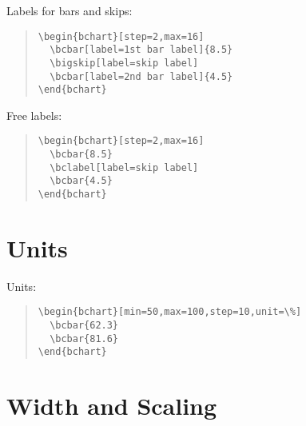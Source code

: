 \documentclass{article}
\begin{document}
Labels for bars and skips:
\begin{quote}\small
\begin{verbatim}
\begin{bchart}[step=2,max=16]
  \bcbar[label=1st bar label]{8.5}
  \bigskip[label=skip label]
  \bcbar[label=2nd bar label]{4.5}
\end{bchart}
\end{verbatim}
\end{quote}
\begin{quote}
\begin{bchart}[step=2,max=16]
  \bigskip[label=skip label]
\end{bchart}
\end{quote}

Free labels:
\begin{quote}\small
\begin{verbatim}
\begin{bchart}[step=2,max=16]
  \bcbar{8.5}
  \bclabel[label=skip label]
  \bcbar{4.5}
\end{bchart}
\end{verbatim}
\end{quote}
\begin{quote}
\begin{bchart}[step=2,max=16]
\end{bchart}
\end{quote}


\section{Units}

Units:
\begin{quote}\small
\begin{verbatim}
\begin{bchart}[min=50,max=100,step=10,unit=\%]
  \bcbar{62.3}
  \bcbar{81.6}
\end{bchart}
\end{verbatim}
\end{quote}
\begin{quote}
\begin{bchart}[min=50,max=100,step=10,unit=\%]
\end{bchart}
\end{quote}


\section{Width and Scaling}
\end{document}
